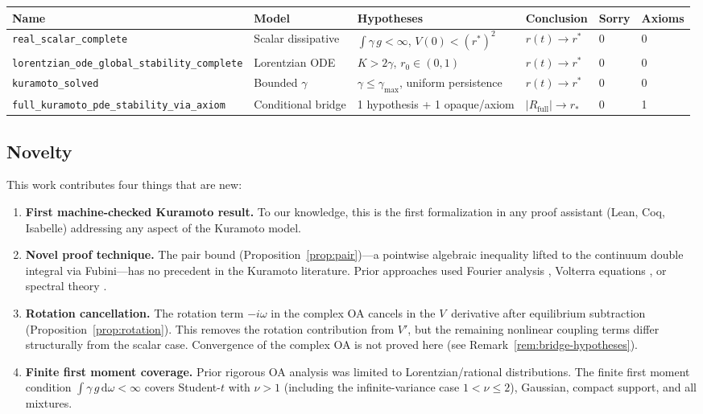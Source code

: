 \documentclass[11pt,a4paper]{article}
\theoremstyle{definition}
\begin{document}
\begin{center}
\small
\begin{tabular}{llllll}
\textbf{Name} & \textbf{Model} & \textbf{Hypotheses} & \textbf{Conclusion} & \textbf{Sorry} & \textbf{Axioms} \\
\hline
\texttt{real\_scalar\_complete} & Scalar dissipative & $\int\gamma\,g < \infty$, $V(0) < (r^*)^2$ & $r(t) \to r^*$ & 0 & 0 \\
\texttt{lorentzian\_ode\_global\_stability\_complete} & Lorentzian ODE & $K > 2\gamma$, $r_0 \in (0,1)$ & $r(t) \to r^*$ & 0 & 0 \\
\texttt{kuramoto\_solved} & Bounded $\gamma$ & $\gamma \leq \gamma_{\max}$, uniform persistence & $r(t) \to r^*$ & 0 & 0 \\
\texttt{full\_kuramoto\_pde\_stability\_via\_axiom} & Conditional bridge & 1 hypothesis + 1 opaque/axiom & $|R_{\mathrm{full}}| \to r_*$ & 0 & 1 \\
\end{tabular}
\end{center}

\subsection{Novelty}

This work contributes four things that are new:

\begin{enumerate}
\item \textbf{First machine-checked Kuramoto result.} To our knowledge, this is the first formalization in any proof assistant (Lean, Coq, Isabelle) addressing any aspect of the Kuramoto model.

\item \textbf{Novel proof technique.} The pair bound (Proposition~\ref{prop:pair})---a pointwise algebraic inequality lifted to the continuum double integral via Fubini---has no precedent in the Kuramoto literature. Prior approaches used Fourier analysis \cite{dietert2016}, Volterra equations \cite{dietert-fernandez2018}, or spectral theory \cite{chiba2015}.

\item \textbf{Rotation cancellation.} The rotation term $-i\omega$ in the complex OA cancels in the $V$~derivative after equilibrium subtraction (Proposition~\ref{prop:rotation}). This removes the rotation contribution from $V'$, but the remaining nonlinear coupling terms differ structurally from the scalar case. Convergence of the complex OA is not proved here (see Remark~\ref{rem:bridge-hypotheses}).

\item \textbf{Finite first moment coverage.} Prior rigorous OA analysis was limited to Lorentzian/rational distributions. The finite first moment condition $\int \gamma\,g\,\mathrm{d}\omega < \infty$ covers Student-$t$ with $\nu > 1$ (including the infinite-variance case $1 < \nu \leq 2$), Gaussian, compact support, and all mixtures.
\end{enumerate}
\end{document}

